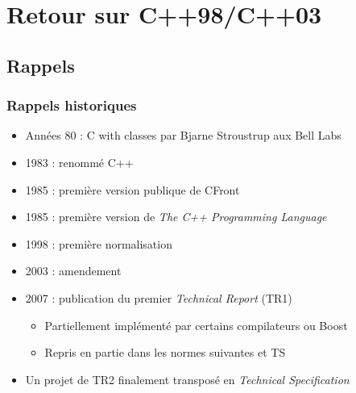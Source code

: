 \documentclass[C++.tex]{subfiles}
\begin{document}
\section{Retour sur C++98/C++03}
\subsection*{Rappels}
\begin{frame}
	\frametitle{Rappels historiques}
	\begin{itemize}
		\item Années 80 : \og C with classes\fg{} par Bjarne Stroustrup aux Bell Labs
		\item 1983 : renommé C++
		\item 1985 : première version publique de CFront 
		\item 1985 : première version de \textit{The C++ Programming Language} 
		\item 1998 : première normalisation
		\item 2003 : amendement
		\item 2007 : publication du premier \textit{Technical Report} (TR1)
		
		
		\begin{itemize}
			\item Partiellement implémenté par certains compilateurs ou Boost
			\item Repris en partie dans les normes suivantes et TS
			
			
		\end{itemize}
		\item Un projet de TR2 finalement transposé en \textit{Technical Specification}
		
	\end{itemize}
\end{frame}
\end{document}
